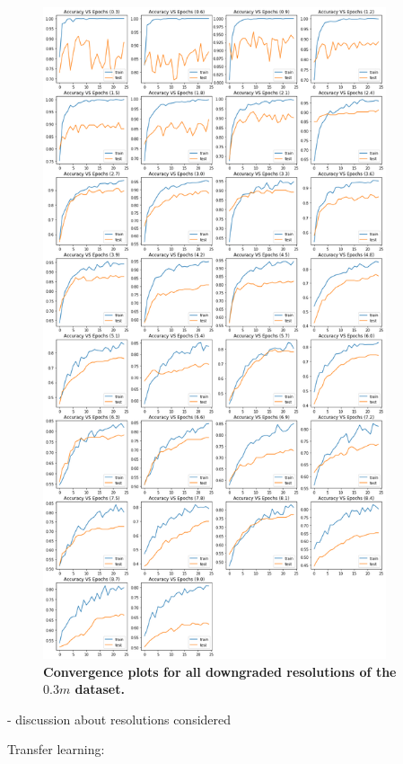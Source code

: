 \begin{figure}[h!]
	\centering
	\includegraphics[width=0.9\textwidth]{Figures/results/convergence_plots_all_res.png}
	\captionsetup{width=1\linewidth}
	\caption{\textbf{Convergence plots for all downgraded resolutions of the $0.3m$ dataset.}}
	\label{fig:conv_plots}
\end{figure}

- discussion about resolutions considered


\vspace{2cm}

Transfer learning: 

